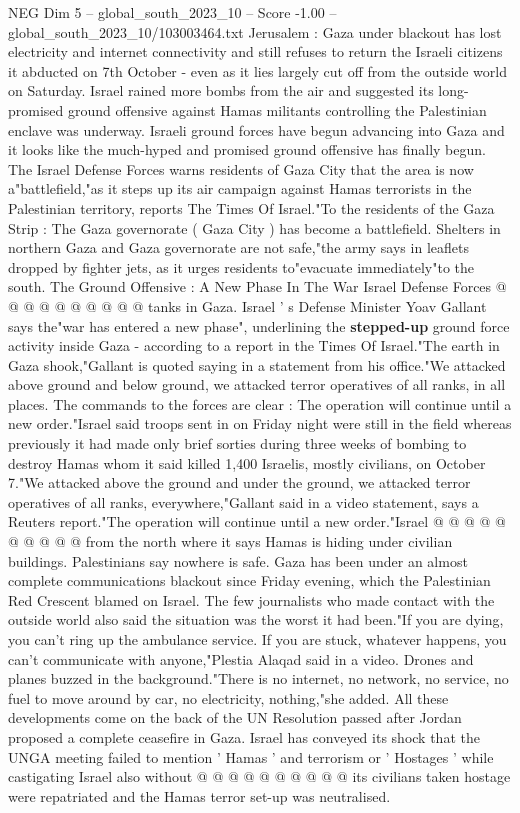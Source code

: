 \begin{textsample}{NEG Dim 5 – global\_south\_2023\_10 – Score -1.00 – global\_south\_2023\_10/103003464.txt}  \label{ex:f5_neg_069}
Jerusalem : Gaza under blackout has lost electricity and internet connectivity and still refuses to return the Israeli citizens it abducted on 7th October - even as it lies largely cut off from the outside world on Saturday.
Israel rained more bombs from the air and suggested its long-promised ground offensive against Hamas militants controlling the Palestinian enclave was underway.
Israeli ground forces have begun advancing into Gaza and it looks like the much-hyped and promised ground offensive has finally begun.
The Israel Defense Forces warns residents of Gaza City that the area is now a"battlefield,"as it steps up its air campaign against Hamas terrorists in the Palestinian territory, reports The Times Of Israel."To the residents of the Gaza Strip : The Gaza governorate ( Gaza City ) has become a battlefield.
Shelters in northern Gaza and Gaza governorate are not safe,"the army says in leaflets dropped by fighter jets, as it urges residents to"evacuate immediately"to the south.
The Ground Offensive : A New Phase In The War Israel Defense Forces @ @ @ @ @ @ @ @ @ @ tanks in Gaza.
Israel ' s Defense Minister Yoav Gallant says the"war has entered a new phase", underlining the \textbf{stepped-up} ground force activity inside Gaza - according to a report in the Times Of Israel."The earth in Gaza shook,"Gallant is quoted saying in a statement from his office."We attacked above ground and below ground, we attacked terror operatives of all ranks, in all places.
The commands to the forces are clear : The operation will continue until a new order."Israel said troops sent in on Friday night were still in the field whereas previously it had made only brief sorties during three weeks of bombing to destroy Hamas whom it said killed 1,400 Israelis, mostly civilians, on October 7."We attacked above the ground and under the ground, we attacked terror operatives of all ranks, everywhere,"Gallant said in a video statement, says a Reuters report."The operation will continue until a new order."Israel @ @ @ @ @ @ @ @ @ @ from the north where it says Hamas is hiding under civilian buildings.
Palestinians say nowhere is safe.
Gaza has been under an almost complete communications blackout since Friday evening, which the Palestinian Red Crescent blamed on Israel.
The few journalists who made contact with the outside world also said the situation was the worst it had been."If you are dying, you can't ring up the ambulance service.
If you are stuck, whatever happens, you can't communicate with anyone,"Plestia Alaqad said in a video.
Drones and planes buzzed in the background."There is no internet, no network, no service, no fuel to move around by car, no electricity, nothing,"she added.
All these developments come on the back of the UN Resolution passed after Jordan proposed a complete ceasefire in Gaza.
Israel has conveyed its shock that the UNGA meeting failed to mention ' Hamas ' and terrorism or ' Hostages ' while castigating Israel also without @ @ @ @ @ @ @ @ @ @ its civilians taken hostage were repatriated and the Hamas terror set-up was neutralised.

\end{textsample}
